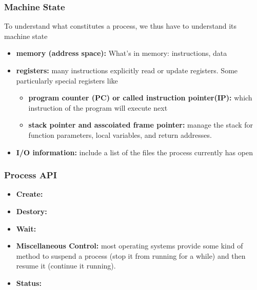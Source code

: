 \documentclass{article}
\begin{document}
\subsubsection{Machine State}
To understand what constitutes a process, we thus have to understand
its machine state
\begin{itemize}
    \item \textbf{memory (address space): }What's in memory: instructions, data
    
    \item \textbf{registers: }many instructions
explicitly read or update registers. Some particularly special registers like
    \begin{itemize}
        \item \textbf{program counter (PC) or called instruction pointer(IP): }which instruction of the program
    will execute next
    \item \textbf{stack pointer and asscoiated frame pointer: }manage the stack for function parameters, local variables,
    and return addresses.
    \end{itemize}
    
    \item \textbf{I/O information: }include a list of the files the process currently has open

\end{itemize}

\subsubsection{Process API}
\begin{itemize}
    \item \textbf{Create: }
    \item \textbf{Destory: }
    \item \textbf{Wait: }
    \item \textbf{Miscellaneous Control: }most operating systems provide some kind of method to suspend a process (stop it from running for a while) and then resume it (continue it running).
    \item \textbf{Status: }
\end{itemize}
\end{document}
